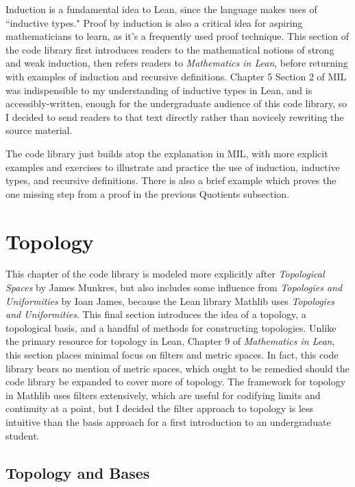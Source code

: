 Induction is a fundamental idea to Lean, since the language makes uses of
``inductive types." Proof by induction is also a critical idea for aspiring 
mathematicians to learn, as it's a frequently used proof technique. This
section of the code library first introduces readers to the mathematical notions
of strong and weak induction, then refers readers to \textit{Mathematics in Lean},
before returning with examples of induction and recursive definitions. Chapter 
5 Section 2 of MIL was indispensible to my understanding of inductive types in 
Lean, and is accessibly-written, enough for the undergraduate audience of this
code library, so I decided to send readers to that text directly rather than 
novicely rewriting the source material. 

The code library just builds atop the explanation in MIL, with more explicit 
examples and exercises to illustrate and practice the use of induction, 
inductive types, and recursive definitions. There is also a brief example
which proves the one missing step from a proof in the previous Quotients 
subsection.

\section{Topology}

This chapter of the code library is modeled more explicitly after 
\textit{Topological Spaces} by James Munkres, but also includes
some influence from \textit{Topologies and Uniformities} by Ioan James, because 
the Lean library Mathlib uses \textit{Topologies and Uniformities}.
This final section introduces the idea of a topology, a topological basis,
and a handful of methods for constructing topologies. Unlike the primary 
resource for topology in Lean, Chapter 9 of \textit{Mathematics in Lean}, 
this section places minimal focus on filters and metric spaces. In fact, 
this code library bears no mention of metric spaces, which ought to
be remedied should the code library be expanded to cover more of topology.
The framework for topology in Mathlib uses filters extensively, which
are useful for codifying limits and continuity at a point, but I decided 
the filter approach to topology is less intuitive than the basis 
approach for a first introduction to an undergraduate student.

\subsection{Topology and Bases}


